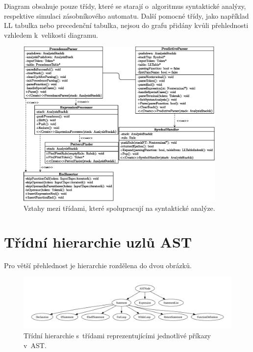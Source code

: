 Diagram obsahuje pouze třídy, které se starají o~algoritmus syntaktické analýzy, respektive simulaci zásobníkového automatu.
Další pomocné třídy, jako například LL tabulka nebo precedenční tabulka, nejsou do grafu přidány kvůli přehlednosti  vzhledem k~velikosti diagramu.
\begin{figure}[ht]
    \centering
    \includegraphics[width=0.92\textwidth]{obrazky-figures/class_diagram.eps}
    \caption{Vztahy mezi třídami, které spolupracují na syntaktické analýze.}
\end{figure}

\chapter{Třídní hierarchie uzlů AST} \label{kap_priloha_c}
Pro větší přehlednost je hierarchie rozdělena do dvou obrázků.
\begin{figure}[h]
    \centering
    \includegraphics[width=\textwidth]{obrazky-figures/hierarchy_statement.pdf}
    \caption{Třídní hierarchie s~třídami reprezentujícími jednotlivé příkazy v~AST.}
    \label{fig_hierarchie_statement}
\end{figure}

